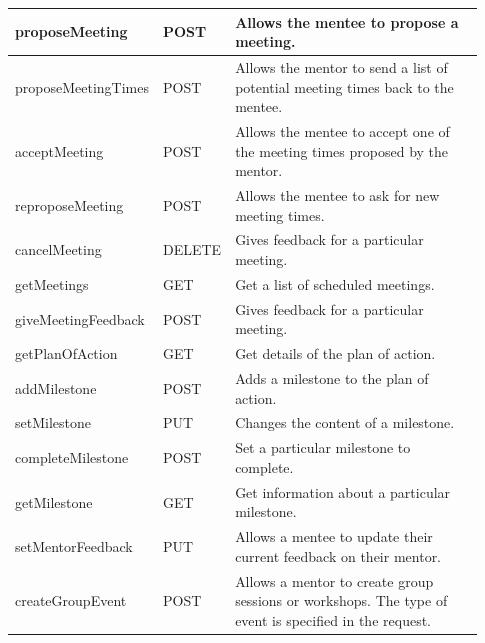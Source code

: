 \documentclass[10pt]{article}
\begin{document}
\begin{longtable}{|p{0.2\linewidth}|p{0.08\linewidth}|p{0.65\linewidth}|}
    proposeMeeting
    &
    POST
    &
    Allows the mentee to propose a meeting.
    \\ \hline

    proposeMeetingTimes
    &
    POST
    &
    Allows the mentor to send a list of potential meeting times back to the mentee.
    \\ \hline

    acceptMeeting
    &
    POST
    &
    Allows the mentee to accept one of the meeting times proposed by the mentor.
    \\ \hline

    reproposeMeeting
    &
    POST
    &
    Allows the mentee to ask for new meeting times.
    \\ \hline

    cancelMeeting
    &
    DELETE
    &
    Gives feedback for a particular meeting.
    \\ \hline

    getMeetings
    &
    GET
    &
    Get a list of scheduled meetings.
    \\ \hline

    giveMeetingFeedback
    &
    POST
    &
    Gives feedback for a particular meeting.
    \\ \hline

    getPlanOfAction
    &
    GET
    &
    Get details of the plan of action.
    \\ \hline

    addMilestone
    &
    POST
    &
    Adds a milestone to the plan of action.
    \\ \hline

    setMilestone
    &
    PUT
    &
    Changes the content of a milestone.
    \\ \hline

    completeMilestone
    &
    POST
    &
    Set a particular milestone to complete.
    \\ \hline

    getMilestone
    &
    GET
    &
    Get information about a particular milestone.
    \\ \hline

    setMentorFeedback
    &
    PUT
    &
    Allows a mentee to update their current feedback on their mentor.
    \\ \hline

    createGroupEvent
    &
    POST
    &
    Allows a mentor to create group sessions or workshops. The type of event is specified in the request.
    \\ \hline


\end{longtable}
\end{document}
